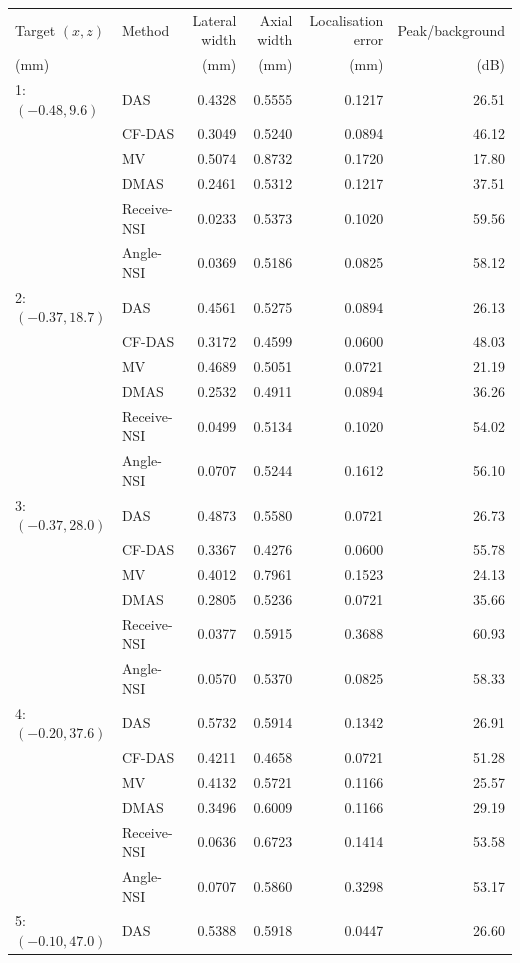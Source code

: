 \begin{tabular}{@{}llrrrr@{}}
\toprule
Target $(x,z)$ & Method & Lateral width & Axial width & Localisation error & Peak/background \\
(mm) & & (mm) & (mm) & (mm) & (dB) \\
\midrule
1: $(-0.48,9.6)$ & DAS & 0.4328 & 0.5555 & 0.1217 & 26.51 \\
 & CF-DAS & 0.3049 & 0.5240 & 0.0894 & 46.12 \\
 & MV & 0.5074 & 0.8732 & 0.1720 & 17.80 \\
 & DMAS & 0.2461 & 0.5312 & 0.1217 & 37.51 \\
 & Receive-NSI & 0.0233 & 0.5373 & 0.1020 & 59.56 \\
 & Angle-NSI & 0.0369 & 0.5186 & 0.0825 & 58.12 \\
\midrule
2: $(-0.37,18.7)$ & DAS & 0.4561 & 0.5275 & 0.0894 & 26.13 \\
 & CF-DAS & 0.3172 & 0.4599 & 0.0600 & 48.03 \\
 & MV & 0.4689 & 0.5051 & 0.0721 & 21.19 \\
 & DMAS & 0.2532 & 0.4911 & 0.0894 & 36.26 \\
 & Receive-NSI & 0.0499 & 0.5134 & 0.1020 & 54.02 \\
 & Angle-NSI & 0.0707 & 0.5244 & 0.1612 & 56.10 \\
\midrule
3: $(-0.37,28.0)$ & DAS & 0.4873 & 0.5580 & 0.0721 & 26.73 \\
 & CF-DAS & 0.3367 & 0.4276 & 0.0600 & 55.78 \\
 & MV & 0.4012 & 0.7961 & 0.1523 & 24.13 \\
 & DMAS & 0.2805 & 0.5236 & 0.0721 & 35.66 \\
 & Receive-NSI & 0.0377 & 0.5915 & 0.3688 & 60.93 \\
 & Angle-NSI & 0.0570 & 0.5370 & 0.0825 & 58.33 \\
\midrule
4: $(-0.20,37.6)$ & DAS & 0.5732 & 0.5914 & 0.1342 & 26.91 \\
 & CF-DAS & 0.4211 & 0.4658 & 0.0721 & 51.28 \\
 & MV & 0.4132 & 0.5721 & 0.1166 & 25.57 \\
 & DMAS & 0.3496 & 0.6009 & 0.1166 & 29.19 \\
 & Receive-NSI & 0.0636 & 0.6723 & 0.1414 & 53.58 \\
 & Angle-NSI & 0.0707 & 0.5860 & 0.3298 & 53.17 \\
\midrule
5: $(-0.10,47.0)$ & DAS & 0.5388 & 0.5918 & 0.0447 & 26.60 \\

\end{tabular}
